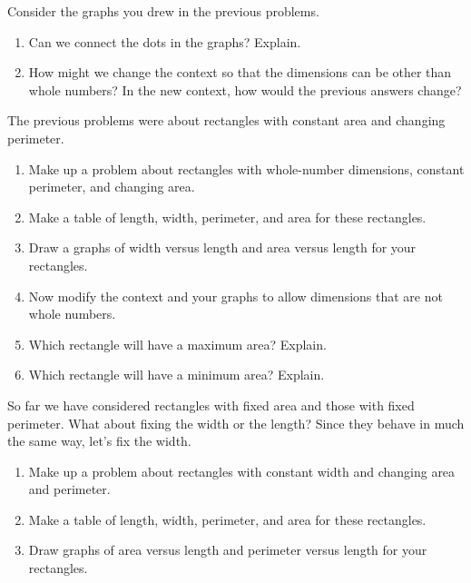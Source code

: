 \begin{prob}  Consider the graphs you drew in the previous problems.  
\begin{enumerate}
\item Can we connect the dots in the graphs?  Explain. 
\item How might we change the context so that the dimensions can be other than whole numbers?   In the new context, how would the previous answers change?
\end{enumerate}
\end{prob}

\begin{prob}
The previous problems were about rectangles with constant area and changing perimeter.  
\begin{enumerate}
\item Make up a problem about rectangles with whole-number dimensions, constant perimeter, and changing area.   
\item Make a table of length, width, perimeter, and area for these rectangles.
\item Draw a graphs of width versus length and area versus length for your rectangles.  
\item Now modify the context and your graphs to allow dimensions that are not whole numbers.   
\item Which rectangle will have a maximum area?  Explain.
\item Which rectangle will have a minimum area?  Explain.
\end{enumerate}
\end{prob}

\begin{prob}
So far we have considered rectangles with fixed area and those with fixed perimeter.  What about fixing the width or the length?  Since they behave in much the same way, let's fix the width.   
\begin{enumerate}
\item Make up a problem about rectangles with constant width and changing area and perimeter.   
\item Make a table of length, width, perimeter, and area for these rectangles.
\item Draw graphs of area versus length and perimeter versus length for your rectangles. 
\end{enumerate}
\end{prob}

